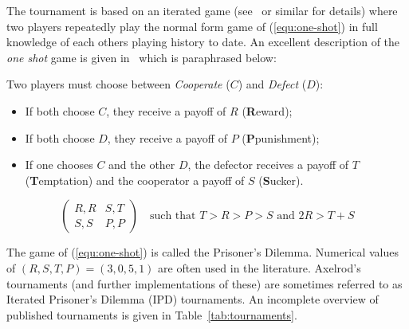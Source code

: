 \documentclass{article}
\begin{document}
The tournament is based on an iterated game (see~\cite{Maschler2013} or similar
for details) where two players repeatedly play the normal form game of
(\ref{equ:one-shot}) in full knowledge of each others playing history to date.
An excellent description of the \textit{one shot} game is given
in~\cite{Gotts2003} which is paraphrased below:

Two players must choose between \textit{Cooperate} (\(C\)) and \textit{Defect}
(\(D\)):

\begin{itemize}
    \item If both choose \(C\), they receive a payoff of \(R\)
        (\textbf{R}eward);
    \item If both choose \(D\), they receive a payoff of \(P\)
        (\textbf{P}punishment);
    \item If one chooses \(C\) and the other \(D\), the defector receives a
        payoff of \(T\) (\textbf{T}emptation) and the cooperator a payoff of
        \(S\) (\textbf{S}ucker).
\end{itemize}

\begin{equation}
    \begin{pmatrix}
        R,R & S,T\\
        S,S & P,P
    \end{pmatrix}\quad\text{such that } T>R>P>S \text{ and } 2R > T + S
    \label{equ:one-shot}
\end{equation}

The game of (\ref{equ:one-shot}) is called the Prisoner's Dilemma. Numerical
values of \((R,S,T,P)=(3,0,5,1)\) are often used in the literature. Axelrod's
tournaments (and further implementations of these) are sometimes referred to as
Iterated Prisoner's Dilemma (IPD) tournaments. An incomplete overview of
published tournaments is given in Table~\ref{tab:tournaments}.
\end{document}
